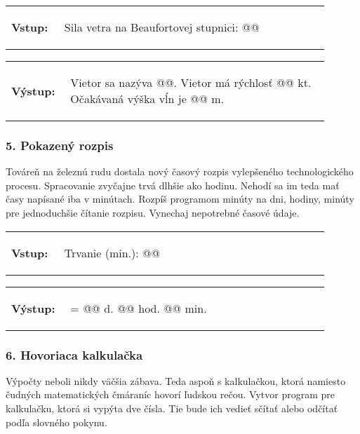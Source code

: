 \begin{tabular}{@{}p{0.15\linewidth}p{0.75\linewidth}}
\textbf{\small Vstup:} &
\vspace{-3em}
\begin{code}
Sila vetra na Beaufortovej stupnici: @\fbox{\phantom{12}}@
\end{code}
\end{tabular}

\vspace{-2em}
\begin{tabular}{@{}p{0.15\linewidth}p{0.75\linewidth}}
\textbf{\small Výstup:} &
\vspace{-3em}
\begin{code}
Vietor sa nazýva @\fbox{\phantom{vstup}}@.
Vietor má rýchlosť @\fbox{\phantom{vstup}}@ kt.
Očakávaná výška vĺn je @\fbox{\phantom{vstup}}@ m.
\end{code}
\end{tabular}
\vspace{-2em}


\subsubsection*{5. Pokazený rozpis}
Továreň na železnú rudu dostala nový časový rozpis vylepšeného technologického procesu. Spracovanie zvyčajne trvá dlhšie ako hodinu. Nehodí sa im teda mať časy napísané iba v minútach. Rozpíš programom minúty na dni, hodiny, minúty pre jednoduchšie čítanie rozpisu. Vynechaj nepotrebné časové údaje.

\begin{tabular}{@{}p{0.15\linewidth}p{0.75\linewidth}}
\textbf{\small Vstup:} &
\vspace{-3em}
\begin{code}
Trvanie (min.): @\fbox{\phantom{vstup}}@
\end{code}
\end{tabular}

\vspace{-2em}
\begin{tabular}{@{}p{0.15\linewidth}p{0.75\linewidth}}
\textbf{\small Výstup:} &
\vspace{-3em}
\begin{code}
= @\fbox{\phantom{vstup}}@ d. @\fbox{\phantom{vstup}}@ hod. @\fbox{\phantom{vstup}}@ min.
\end{code}
\end{tabular}
\vspace{-2em}


\subsubsection*{6. Hovoriaca kalkulačka}
Výpočty neboli nikdy väčšia zábava. Teda aspoň s kalkulačkou, ktorá namiesto čudných matematických čmáraníc hovorí ľudskou rečou. Vytvor program pre kalkulačku, ktorá si vypýta dve čísla. Tie bude ich vedieť sčítať alebo odčítať podľa slovného pokynu.

